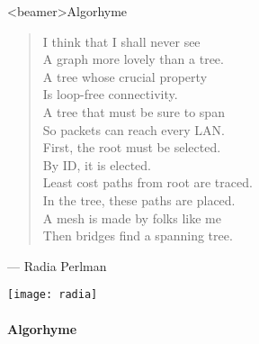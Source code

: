 \begin{frame}<beamer>{Algorhyme}
  \begin{minipage}{.55\linewidth}
    \begin{verse}
      I think that I shall never see\\
      A graph more lovely than a tree.\\[1ex]
      A tree whose crucial property\\
      Is loop-free connectivity.\\[1ex]
      A tree that must be sure to span\\
      So packets can reach every LAN.\\[1ex]
      First, the root must be selected.\\
      By ID, it is elected.\\[1ex]
      Least cost paths from root are traced.\\
      In the tree, these paths are placed.\\[1ex]
      A mesh is made by folks like me\\
      Then bridges find a spanning tree.\\[1ex]
    \end{verse}
    \begin{flushright}{\footnotesize --- Radia Perlman\hspace{3em}}\end{flushright}    
  \end{minipage}
  \begin{minipage}{.4\linewidth}
    \texttt{[image: radia]}
  \end{minipage}
\end{frame}

\paragraph{Algorhyme}\ \\

